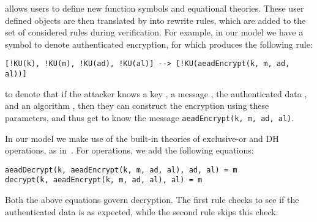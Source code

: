{%

\mTamarin{} allows users to define new function symbols and equational theories.
These user defined objects are then translated by \mTamarin{} into rewrite
rules, which are added to the set of considered rules during verification.
For example, in our model we have a symbol to denote authenticated encryption, for which \mTamarin{} produces the following rule:
%
\begin{lstlisting}
[!KU(k), !KU(m), !KU(ad), !KU(al)] --> [!KU(aeadEncrypt(k, m, ad, al))]
\end{lstlisting}
%
to denote that if the attacker knows a key , a message , the
authenticated data , and an algorithm , then they can construct
the encryption using these parameters, and thus get to know the message
\lstinline{aeadEncrypt(k, m, ad, al)}.

In our model we make use of
the built-in theories of exclusive-or and DH operations, as in~\cite{DBLP:conf/csfw/DreierHRS18,DBLP:conf/csfw/SchmidtMCB12}.
%
%
For \mAead{} operations, we add the following equations:
\begin{lstlisting}
aeadDecrypt(k, aeadEncrypt(k, m, ad, al), ad, al) = m
decrypt(k, aeadEncrypt(k, m, ad, al), al) = m
\end{lstlisting}
Both the above equations govern decryption. The first rule checks to see if the authenticated data is as expected, while the second rule skips this check.


}
